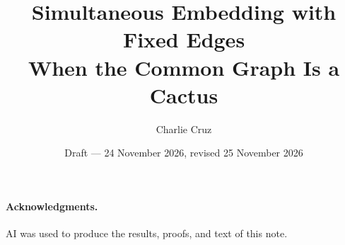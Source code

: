 \documentclass[11pt]{article}
\title{Simultaneous Embedding with Fixed Edges\\When the Common Graph Is a Cactus}
\author{Charlie Cruz}
\date{Draft --- 24 November 2026, revised 25 November 2026}
\theoremstyle{definition}
\theoremstyle{remark}
\begin{document}
\maketitle








\appendix

\paragraph{Acknowledgments.}
AI was used to produce the results, proofs, and text of this note.


\end{document}
